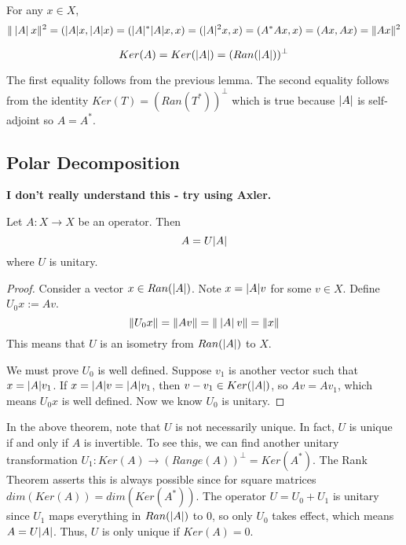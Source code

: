 \begin{lproof}
For any $x \in X$, 
$$\lVert\: \lvert A\rvert \: x\rVert^{2} = (\lvert A\rvert x, \lvert A\rvert x) = (\lvert A\rvert^{*} \lvert A\rvert x, x) = (\lvert A\rvert^{2} x, x) = (A^{*} A x, x) = (Ax, Ax) = \lVert Ax\rVert^{2}$$
\end{lproof}

\begin{lemma}
$$Ker(A) = Ker(\lvert A\rvert) = (Ran(\lvert A\rvert))^{\perp}$$
\end{lemma}

\begin{lproof}
The first equality follows from the previous lemma. The second equality follows from the identity $Ker(T) = (Ran(T^{*}))^{\perp}$ which is true because $\lvert A\rvert$ is self-adjoint so $A = A^{*}$. 
\end{lproof}

\subsection{Polar Decomposition}
\textbf{I don't really understand this - try using Axler.}
\begin{theorem}
Let $A: X \rightarrow X$ be an operator. Then 
$$A = U \lvert A\rvert$$
where $U$ is unitary. 
\end{theorem}

\begin{proof}
Consider a vector $x \in Ran(\lvert A\rvert)$. Note $x = \lvert A\rvert v$ for some $v \in X$. Define $U_{0} x := Av$. 
$$\lVert U_{0} x\rVert = \lVert Av\rVert = \lVert \: \lvert A\rvert \: v\rVert = \lVert x\rVert$$
This means that $U$ is an isometry from $Ran(\lvert A\rvert)$ to $X$. 

We must prove $U_{0}$ is well defined. Suppose $v_{1}$ is another vector such that $x = \lvert A\rvert v_{1}$. If $x = \lvert A\rvert v = \lvert A\rvert v_{1}$, then $v - v_{1} \in Ker(\lvert A\rvert)$, so $Av = Av_{1}$, which means $U_{0} x$ is well defined. Now we know $U_{0}$ is unitary. 
\end{proof}

In the above theorem, note that $U$ is not necessarily unique. In fact, $U$ is unique if and only if $A$ is invertible. To see this, we can find another unitary transformation $U_{1}: Ker(A) \rightarrow (Range(A))^{\perp} = Ker(A^{*})$. The Rank Theorem asserts this is always possible since for square matrices $dim(Ker(A)) = dim(Ker(A^{*}))$. The operator $U = U_{0} + U_{1}$ is unitary since $U_{1}$ maps everything in $Ran(\lvert A\rvert)$ to 0, so only $U_{0}$ takes effect, which means $A = U \lvert A\rvert$. Thus, $U$ is only unique if $Ker(A) = 0$. 

